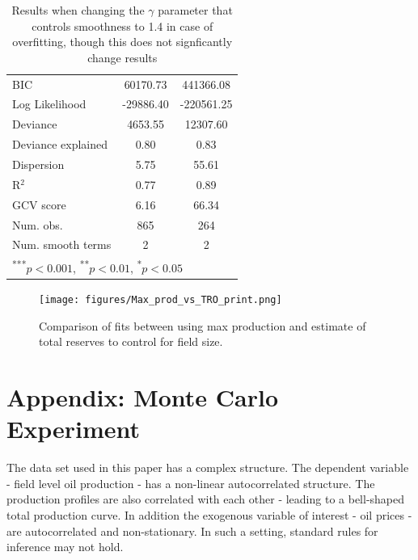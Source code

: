 \documentclass[11pt]{article}
\begin{document}
\begin{spacing}{1}
\begin{table}
\begin{center}
\begin{tabular}{l c c }
BIC                                  & 60170.73      & 441366.08     \\
Log Likelihood                       & -29886.40     & -220561.25    \\
Deviance                             & 4653.55       & 12307.60      \\
Deviance explained                   & 0.80          & 0.83          \\
Dispersion                           & 5.75          & 55.61         \\
R$^2$                                & 0.77          & 0.89          \\
GCV score                            & 6.16          & 66.34         \\
Num. obs.                            & 865           & 264           \\
Num. smooth terms                    & 2             & 2             \\
\hline
\multicolumn{3}{l}{\scriptsize{\textsuperscript{***}$p<0.001$, 
  \textsuperscript{**}$p<0.01$, 
  \textsuperscript{*}$p<0.05$}}
\end{tabular}
\caption{Results when changing the $\gamma$ parameter that controls smoothness to 1.4 in case of overfitting, though this does not signficantly change results}
\label{table:gamma_check}
\end{center}
\end{table}

\begin{figure}
	\texttt{[image: figures/Max\_prod\_vs\_TRO\_print.png]}
	\caption{Comparison of fits between using max production and estimate of total reserves to control for field size.}
	\label{chart:Max_prod_vs_TRO_print}
\end{figure}

\FloatBarrier

\section{Appendix: Monte Carlo Experiment}


The data set used in this paper has a complex structure.  The dependent variable - field level oil production - has a non-linear autocorrelated structure.  The production profiles are also correlated with each other - leading to a bell-shaped total production curve.  In addition the exogenous variable of interest - oil prices - are autocorrelated and non-stationary.    In such a setting, standard rules for inference may not hold. 


\end{spacing}
\end{document}
